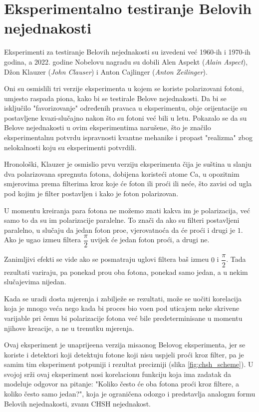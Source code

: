 \chapter{Eksperimentalno testiranje Belovih nejednakosti}


Eksperimenti za testiranje Belovih nejednakosti su izvedeni ve\' c 1960-ih i 1970-ih godina, a 2022. godine Nobelovu
nagradu su dobili Alen Aspekt (\textit{Alain Aspect}), D\v zon Klauzer (\textit{John Clauser}) i Anton Cajlinger (\textit{Anton Zeilinger}).

Oni su osmislili tri verzije eksperimenta u kojem se koriste polarizovani fotoni, umjesto raspada piona,
kako bi se testirale Belove nejednakosti. Da bi se isklju\v cilo "favorizovanje" određenih pravaca u eksperimentu, obje orijentacije su
postavljene kvazi-slu\v cajno nakon \v sto su fotoni ve\' c bili u letu.
Pokazalo se da su Belove nejednakosti u ovim eksperimentima naru\v sene, \v sto je zna\v cilo eksperimentalnu potvrdu
ispravnosti kvantne mehanike i propast "realizma" zbog nelokalnosti koju su eksperimenti potvrdili.

Hronolo\v ski, Klauzer je osmislio prvu verziju eksperimenta \v cija je 
su\v stina u slanju dva polarizovana spregnuta fotona, dobijena koriste\' ci atome Ca, u opozitnim smjerovima prema filterima kroz koje
\' ce foton ili pro\' ci ili ne\' ce, \v sto zavisi od ugla pod kojim je filter postavljen
i kako je foton polarizovan.

U momentu kreiranja para fotona ne mo\v zemo znati kakva im je polarizacija, ve\' c samo to da su im
polarizacije paralelne. To zna\v ci da ako su filteri postavljeni paralelno, u slu\v caju da jedan foton pro\dj e, vjerovatno\' ca da \' ce pro\' ci i drugi je $1$.
Ako je ugao izme\dj u filtera $\dfrac{\pi}{2}$ uvijek \' ce jedan foton pro\' ci, a drugi ne.

Zanimljivi efekti se vide ako se posmatraju uglovi filtera ba\v s izme\dj u $0$ i $\dfrac{\pi}{2}$. Tada rezultati variraju,
pa ponekad pro\dj u oba fotona, ponekad samo jedan, a u nekim slu\v cajevima nijedan.

Kada se uradi dosta mjerenja i zabilje\v ze se rezultati, mo\v ze se uo\v citi korelacija koja je mnogo ve\'ca nego kada bi
proces bio vo\dj en pod uticajem neke skrivene varijable pri \v cemu bi polarizacije fotona ve\'c bile predeterminisane u momentu njihove kreacije, a ne u trenutku mjerenja.

Ovaj eksperiment je unaprije\dj ena verzija misaonog Belovog eksperimenta, jer se koriste i detektori koji
detektuju fotone koji nisu uspjeli pro\'ci kroz filter, pa je samim tim eksperiment potpuniji i rezultat precizniji (slika \ref{fig:chsh_scheme}).
U svojoj sr\v zi ovaj eksperiment nosi korelacionu funkciju koja ima zadatak da modeluje odgovor na pitanje: "Koliko
\v cesto \'ce oba fotona pro\' ci kroz filtere, a koliko \v cesto samo jedan?", koja je ograni\v cena odozgo i predstavlja analognu formu
Belovih nejednakosti, zvanu CHSH nejednakost.

